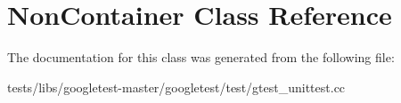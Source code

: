 \hypertarget{classNonContainer}{}\section{Non\+Container Class Reference}
\label{classNonContainer}


The documentation for this class was generated from the following file\+:\begin{DoxyCompactItemize}
\item 
tests/libs/googletest-\/master/googletest/test/gtest\+\_\+unittest.\+cc\end{DoxyCompactItemize}
